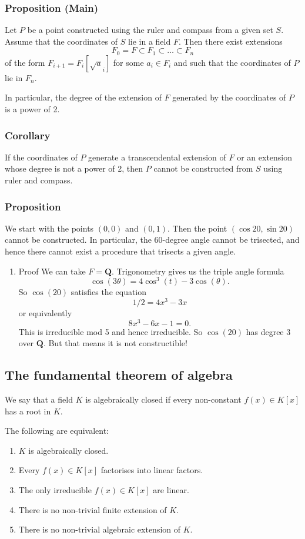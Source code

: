 \documentclass[11pt]{article}
\begin{document}
\subsubsection{Proposition (Main)}
\label{sec:org83e13f4}
Let \(P\) be a point constructed using the ruler and compass from a given set \(S\).
Assume that the coordinates of \(S\) lie in a field \(F\).
Then there exist extensions
\[ F_{0} = F \subset F_1 \subset \dots \subset F_{n}\]
of the form \(F_{i+1} = F_i[\sqrt a_i]\) for some \(a_i \in F_i\) and such that the coordinates of \(P\) lie in \(F_{n}\).

In particular, the degree of the extension of \(F\) generated by the coordinates of \(P\) is a power of 2.
\subsubsection{Corollary}
\label{sec:orge422641}
If the coordinates of \(P\) generate a transcendental extension of \(F\) or an extension whose degree is not a power of 2, then \(P\) cannot be constructed from \(S\) using ruler and compass.
\subsubsection{Proposition}
\label{sec:orgc931112}
We start with the points \((0,0)\) and \((0,1)\).
Then the point \((\cos 20, \sin 20)\) cannot be constructed.
In particular, the \(60\)-degree angle cannot be trisected, and hence there cannot exist a procedure that trisects a given angle.
\begin{enumerate}
\item Proof
\label{sec:orgc42b97d}
We can take \(F = \mathbf{Q}\).
Trigonometry gives us the triple angle formula
\[ \cos(3\theta) = 4 \cos^3(t) - 3 \cos(\theta).\]
So \(\cos(20)\) satisfies the equation
\[ 1/2 = 4 x^3 - 3x\]
or equivalently
\[ 8x^3-6x-1 = 0.\]
This is irreducible mod 5 and hence irreducible.
So \(\cos(20)\) has degree 3 over \(\mathbf{Q}\).
But that means it is not constructible!
\end{enumerate}
\subsection{The fundamental theorem of algebra}
\label{sec:orgcfd35c4}
We say that a field \(K\) is algebraically closed if every non-constant \(f(x) \in K[x]\) has a root in \(K\).

The following are equivalent:
\begin{enumerate}
\item \(K\) is algebraically closed.
\item Every \(f(x) \in K[x]\) factorises into linear factors.
\item The only irreducible \(f(x) \in K[x]\) are linear.
\item There is no non-trivial finite extension of \(K\).
\item There is no non-trivial algebraic extension of \(K\).
\end{enumerate}
\end{document}

